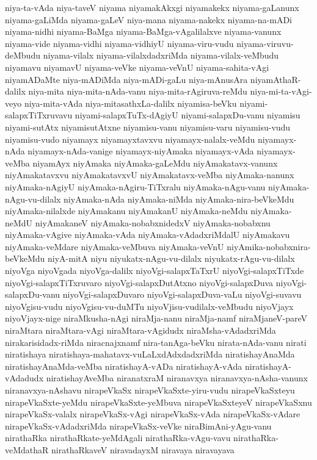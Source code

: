 {niya-ta-vAda
niya-taveV
niyama
niyamakAkxgi
niyamakekx
niyama-gaLanunx
niyama-gaLiMda
niyama-gaLeV
niya-mana
niyama-nakekx
niyama-na-mADi
niyama-nidhi
niyama-BaMga
niyama-BaMga-vAgalilalxve
niyama-vanunx
niyama-vide
niyama-vidhi
niyama-vidhiyU
niyama-viru-vudu
niyama-viruvu-deMbudu
niyama-vilalx
niyama-vilalxdadxriMda
niyama-vilalx-veMbudu
niyamavu
niyamavU
niyama-veVke
niyama-veVnU
niyama-sahita-vAgi
niyamADaMte
niya-mADiMda
niya-mADi-gaLu
niya-mAnusAra
niyamAthaR-dalilx
niya-mita
niya-mita-nAda-vanu
niya-mita-rAgiruva-reMdu
niya-mi-ta-vAgi-veyo
niya-mita-vAda
niya-mitasathxLa-dalilx
niyamisa-beVku
niyami-salapxTiTxruvavu
niyami-salapxTuTx-dAgiyU
niyami-salapxDu-vanu
niyamisu
niyami-sutAtx
niyamisutAtxne
niyamisu-vanu
niyamisu-varu
niyamisu-vudu
niyamisu-vudo
niyamayx
niyamayxtavxvu
niyamayx-nalalx-veMdu
niyamayx-nAda
niyamayx-nAda-vanige
niyamayx-niyAmaka
niyamayx-vAda
niyamayx-veMba
niyamAyx
niyAmaka
niyAmaka-gaLeMdu
niyAmakatavx-vanunx
niyAmakatavxvu
niyAmakatavxvU
niyAmakatavx-veMba
niyAmaka-nanunx
niyAmaka-nAgiyU
niyAmaka-nAgiru-TiTxralu
niyAmaka-nAgu-vanu
niyAmaka-nAgu-vu-dilalx
niyAmaka-nAda
niyAmaka-niMda
niyAmaka-nira-beVkeMdu
niyAmaka-nilalxde
niyAmakanu
niyAmakanU
niyAmaka-neMdu
niyAmaka-neMdU
niyAmakaneV
niyAmaka-nobabxnidedxV
niyAmaka-nobabxnu
niyAmaka-vAgive
niyAmaka-vAda
niyAmaka-vAdadxriMdalU
niyAmakavu
niyAmaka-veMdare
niyAmaka-veMbuva
niyAmaka-veVnU
niyAmika-nobabxnira-beVkeMdu
niyA-mitA
niyu
niyukatx-nAgu-vu-dilalx
niyukatx-rAgu-vu-dilalx
niyoVga
niyoVgada
niyoVga-dalilx
niyoVgi-salapxTaTxrU
niyoVgi-salapxTiTxde
niyoVgi-salapxTiTxruvaro
niyoVgi-salapxDutAtxno
niyoVgi-salapxDuva
niyoVgi-salapxDu-vanu
niyoVgi-salapxDuvaro
niyoVgi-salapxDuva-vaLu
niyoVgi-suvavu
niyoVgisu-vudu
niyoVgisu-vu-duMTu
niyoVjisu-vudilalx-veMbudu
niyoVjayx
niyoVjayx-nige
niraMkusha-nAgi
niraMja-nanu
niraMja-namf
niraMjaneV-pareV
niraMtara
niraMtara-vAgi
niraMtara-vAgidudx
niraMsha-vAdadxriMda
nirakarisidadx-riMda
niracnajxnamf
nira-tanAga-beVku
nirata-nAda-vanu
nirati
niratishaya
niratishaya-mahatavx-vuLaLxdAdxdadxriMda
niratishayAnaMda
niratishayAnaMda-veMba
niratishayA-vADa
niratishayA-vAda
niratishayA-vAdadudx
niratishayAveMba
niranatxraM
niranavxya
niranavxya-nAsha-vanunx
niranavxya-nAshavu
nirapeVkaSx
nirapeVkaSxte-yiru-vudu
nirapeVkaSxteyu
nirapeVkaSxte-yeMdu
nirapeVkaSxte-yeMbuva
nirapeVkaSxteyeV
nirapeVkaSxnu
nirapeVkaSx-valalx
nirapeVkaSx-vAgi
nirapeVkaSx-vAda
nirapeVkaSx-vAdare
nirapeVkaSx-vAdadxriMda
nirapeVkaSx-veVke
niraBimAni-yAgu-vanu
nirathaRka
nirathaRkate-yeMdAgali
nirathaRka-vAgu-vavu
nirathaRka-veMdathaR
nirathaRkaveV
niravadayxM
niravaya
niravayava
}
